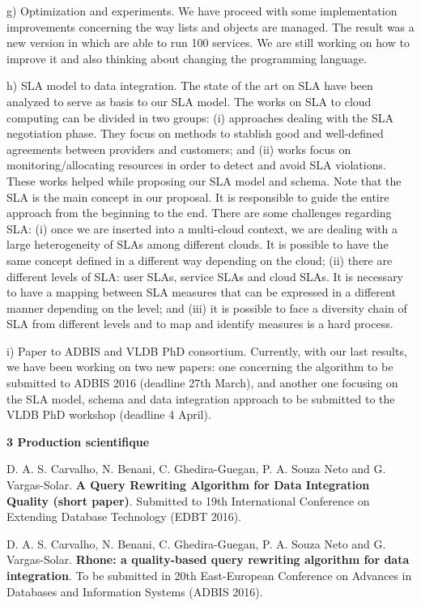 \documentclass[11pt,a4paper,oneside]{report}
\begin{document}
g) Optimization and experiments. We have proceed with some implementation improvements concerning the way lists and objects are managed. The result was a new version in which are able to run 100 services. We are still working on how to improve it and also thinking about changing the programming language.

h) SLA model to data integration. The state of the art on SLA have been analyzed to serve as basis to our SLA model. The works on SLA to cloud computing can be divided in two groups: (i) approaches dealing with the SLA negotiation phase. They focus on methods to stablish good and well-defined agreements between providers and customers; and (ii) works focus on monitoring/allocating resources in order to detect and avoid SLA violations. These works helped while proposing our SLA model and schema. Note that the SLA is the main concept in our proposal. It is responsible to guide the entire approach from the beginning to the end. There are some challenges regarding SLA: (i) once we are inserted into a multi-cloud context, we are dealing with a large heterogeneity of SLAs among different clouds. It is possible to have the same concept defined in a different way depending on the cloud; (ii) there are different levels of SLA: user SLAs, service SLAs and cloud SLAs. It is necessary to have a mapping between SLA measures that can be expressed in a different manner depending on the level; and (iii) it is possible to face a diversity chain of SLA from different levels and to map and identify measures is a hard process.

i) Paper to ADBIS and VLDB PhD consortium. Currently, with our last results, we have been working on two new papers: one concerning the algorithm to be submitted to ADBIS 2016 (deadline 27th March), and another one focusing on the SLA model, schema and data integration approach to be submitted to the VLDB PhD workshop (deadline 4 April).

\newpage
\begin{flushleft}
\textbf{3 Production scientifique}\\
\end{flushleft}

\noindent
D. A. S. Carvalho, N. Benani, C. Ghedira-Guegan, P. A. Souza Neto and G. Vargas-Solar. \textbf{A Query Rewriting Algorithm for Data Integration Quality (short paper)}. Submitted to 19th International Conference on Extending Database Technology (EDBT 2016).
\bigskip

\noindent
D. A. S. Carvalho, N. Benani, C. Ghedira-Guegan, P. A. Souza Neto and G. Vargas-Solar. \textbf{Rhone: a quality-based query rewriting algorithm for data integration}. To be submitted in 20th East-European Conference on Advances in Databases and Information Systems (ADBIS 2016).
\bigskip
\end{document}

